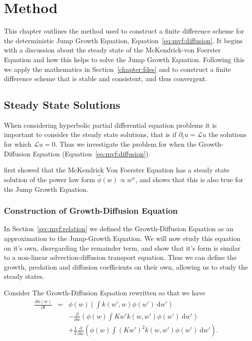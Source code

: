 \documentclass[../main.tex]{subfiles}
\begin{document}
  \chapter{Method}\label{chapter:method}
  This chapter outlines the method used to construct a finite difference scheme for the deterministic Jump Growth Equation, Equation~\ref{eq:mvf:diffusion}. It begins with a discussion about the steady state of the McKendrick-von Foerster Equation and how this helps to solve the Jump Growth Equation. Following this we apply the mathematics in Section~\ref{chapter:fdes} and \cite{rosinger2008} to construct a finite difference scheme that is stable and consistent, and thus convergent.


  \section{Steady State Solutions}\label{sec:met:steadystate}
  When considering hyperbolic partial differential equation problems it is important to consider the steady state solutions, that is if $\partial_t u = \mathcal{L}u$ the solutions for which $\mathcal{L}u = 0$. Thus we investigate the problem for when the Growth-Diffusion Equation (Equation~\ref{eq:mvf:diffusion}).

  \cite{benoit2004} first showed that the McKendrick Von Foerster Equation has a steady state solution of the power law form $\hat{\phi}(w) \propto w^{\alpha}$, and \cite{datta2010} shows that this is also true for the Jump Growth Equation.

  \subsection{Construction of Growth-Diffusion Equation}
  In Section~\ref{sec:mvf:relation} we defined the Growth-Diffusion Equation as an approximation to the Jump-Growth Equation. We will now study this equation on it's own, disregarding the remainder term, and show that it's form is similar to a non-linear advection-diffusion transport equation. Thus we can define the growth, predation and diffusion coefficients on their own, allowing us to study the steady states.

  Consider The Growth-Diffusion Equation rewritten so that we have
  \begin{eqnarray}
    \frac{\partial \phi(w)}{\partial t}
    &=& \phi(w) \left( \int k(w', w) \phi(w') \: \mathrm{d}w' \right) \nonumber \\
    && -  \frac{\partial}{\partial w} \left( \phi(w)  \int K w' k(w, w')\phi(w') \: \mathrm{d}w' \right) \nonumber \\
    && + \frac{1}{2} \frac{\partial}{\partial w} \left( \phi(w) \int (K w')^2 k(w, w')\phi(w')  \: \mathrm{d}w' \right).
  \end{eqnarray}
\end{document}
